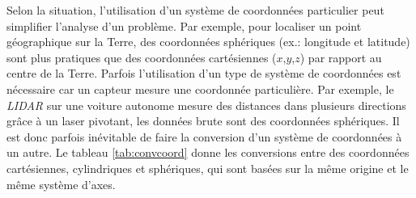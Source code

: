 Selon la situation, l'utilisation d'un système de coordonnées particulier peut simplifier l'analyse d'un problème. Par exemple, pour localiser un point géographique sur la Terre, des coordonnées sphériques (ex.: longitude et latitude) sont plus pratiques que des coordonnées cartésiennes ($x$,$y$,$z$) par rapport au centre de la Terre. Parfois l'utilisation d'un type de système de coordonnées est nécessaire car un capteur mesure une coordonnée particulière. Par exemple, le \textit{LIDAR} sur une voiture autonome mesure des distances dans plusieurs directions grâce à un laser pivotant, les données brute sont des coordonnées sphériques. Il est donc parfois inévitable de faire la conversion d'un système de coordonnées à un autre. Le tableau \ref{tab:convcoord} donne les conversions entre des coordonnées cartésiennes, cylindriques et sphériques, qui sont basées sur la même origine et le même système d'axes.
